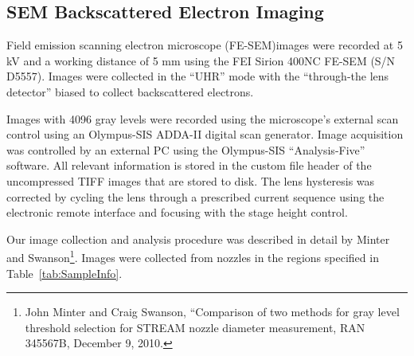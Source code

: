 \subsection{SEM Backscattered Electron Imaging}

Field emission scanning electron microscope (FE-SEM)images were
recorded at 5 kV and a working distance of 5 mm using the FEI
Sirion 400NC FE-SEM (S/N D5557). Images were collected in the
``UHR'' mode with the ``through-the lens detector'' biased to
collect backscattered electrons.

Images with 4096 gray levels were recorded using the
microscope's external scan control using an Olympus-SIS ADDA-II
digital scan generator. Image acquisition was controlled
by an external PC using the Olympus-SIS ``Analysis-Five''
software. All relevant information is stored in the
custom file header of the uncompressed TIFF images that
are stored to disk. The lens hysteresis was corrected
by cycling the lens through a prescribed current sequence
using the electronic remote interface and focusing with the
stage height control.

Our image collection and analysis procedure was described
in detail by Minter and Swanson\footnote{John Minter and Craig
Swanson, ``Comparison of two methods for gray level threshold
selection for STREAM nozzle diameter measurement, RAN 345567B,
December 9, 2010.}. Images were collected from nozzles
in the regions specified in Table~\ref{tab:SampleInfo}.

\endinput
